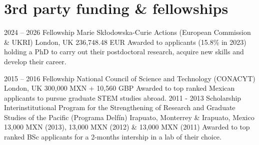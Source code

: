 \documentclass[]{friggeri-cv} %
\begin{document}
%
%
%
%
%


\section{3rd party funding \& fellowships}

\begin{entrylist}
\entry
{2024 -- 2026}
{Fellowship}
{Marie Skłodowska-Curie Actions (European Commission \& UKRI)}
{London, UK}
{{\normalsize  236,748.48 EUR}}
{Awarded to applicants (15.8\% in 2023) holding a PhD to carry out their postdoctoral research, acquire new skills and develop their career.}

\entry
{2015 -- 2016}
{Fellowship}
{National Council of Science and Technology (CONACYT)}
{London, UK}
{{\normalsize 300,000 MXN + 10,560 GBP}}
{Awarded to top ranked Mexican applicants to pursue graduate STEM studies abroad.}
\entry
{2011 - 2013}
{Scholarship}
{Interinstitutional Program for the Strengthening of Research and Graduate Studies of the Pacific (Programa Delfín)}
{Irapuato, Monterrey \& Irapuato, Mexico}
{{\normalsize 13,000 MXN (2013), 13,000 MXN (2012) \& 13,000 MXN (2011)}}
{Awarded to top ranked BSc applicants for a 2-months intership in a lab of their choice.}
\end{entrylist}
\end{document}
